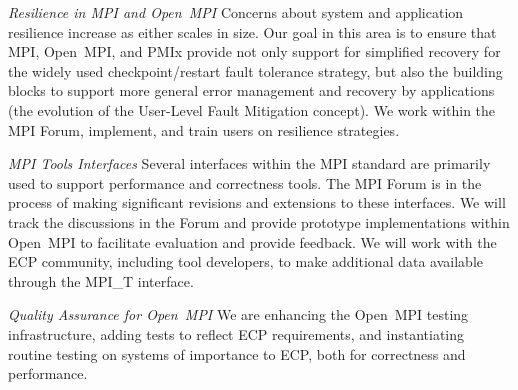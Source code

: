 \emph{Resilience in MPI and Open~MPI} Concerns about system and
application resilience increase as either scales in size.  Our goal in
this area is to ensure that MPI, Open~MPI, and PMIx provide not only
support for simplified
recovery for the widely used checkpoint/restart fault tolerance strategy, but also the building
blocks to support more general error management and recovery by applications (the evolution of the User-Level
Fault Mitigation concept). We work within the MPI Forum, implement,
and train users on resilience strategies.

\emph{MPI Tools Interfaces}  Several interfaces within the
MPI standard are primarily used to support performance and
correctness tools.
The MPI Forum is in the process
of making significant revisions and extensions to these interfaces.
We will track the discussions in the Forum and provide prototype
implementations within Open~MPI to facilitate evaluation and provide
feedback.
We will work with the
ECP community, including tool developers, to make additional data
available through the MPI\_T interface.

\emph{Quality Assurance for Open~MPI}  We are enhancing the
Open~MPI testing infrastructure, adding tests to reflect ECP
requirements, and instantiating routine testing on systems of
importance to ECP, both for correctness and performance.

